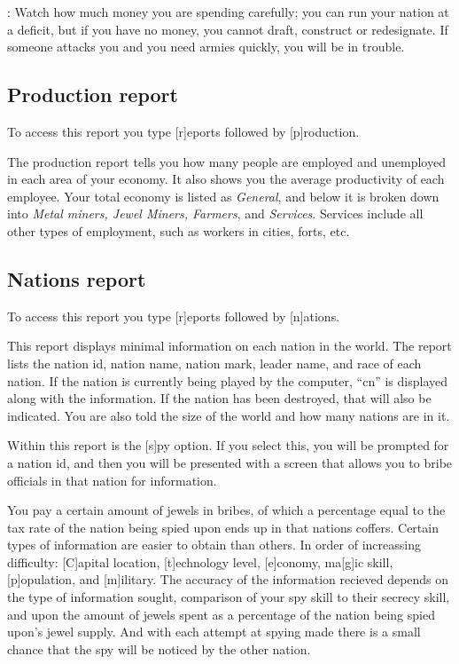 : Watch how much money you are spending
carefully; you can run your nation at a deficit, but if you have no
money, you cannot draft, construct or redesignate.  If someone attacks
you and you need armies quickly, you will be in trouble.

\subsection{Production report}
To access this report you type [r]eports followed by [p]roduction.

The production report tells you how many people are employed and
unemployed in each area of your economy.  It also shows you the
average productivity of each employee.  Your total economy is listed
as {\em General}, and below it is broken down into {\em Metal miners,
Jewel Miners, Farmers}, and {\em Services}.  Services include all
other types of employment, such as workers in cities, forts, etc.

\subsection{Nations report}
To access this report you type [r]eports followed by [n]ations.

This report displays minimal information on each nation in the world.
The report lists the nation id, nation name, nation mark, leader name,
and race of each nation.  If the nation is currently being played by
the computer, ``cn'' is displayed along with the information.  If the
nation has been destroyed, that will also be indicated.  You are also
told the size of the world and how many nations are in it.

Within this report is the [s]py option. If you select this, you will
be prompted for a nation id, and then you will be presented with a
screen that allows you to bribe officials in that nation for
information.

    You pay a certain amount of jewels in bribes, of which a
percentage equal to the tax rate of the nation being spied
upon ends up in that nations coffers. Certain types of information
are easier to obtain than others.  In order of increassing difficulty:
[C]apital location, [t]echnology level, [e]conomy, ma[g]ic skill,
[p]opulation, and [m]ilitary.  The accuracy of the information recieved
depends on the type of information sought, comparison of your spy
skill to their secrecy skill, and upon the amount of jewels
spent as a percentage of the nation being spied upon's jewel
supply.  And with each attempt at spying made there is a small
chance that the spy will be noticed by the other nation.

